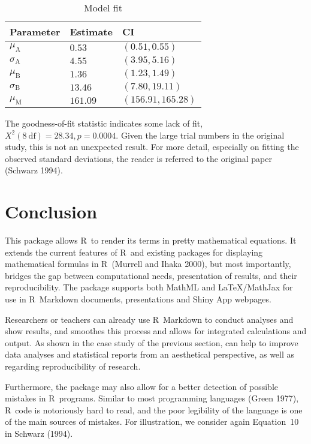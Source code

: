 \begin{table}

\caption{\label{tab:params}Model fit}
\centering
\begin{tabular}[t]{l|l|l}
\hline
Parameter & Estimate & CI\\
\hline
${\mu}_{\mathrm{A}}$ & $0.53$ & $\left({0.51}{{,}{0.55}}\right)$\\
\hline
${\sigma}_{\mathrm{A}}$ & $4.55$ & $\left({3.95}{{,}{5.16}}\right)$\\
\hline
${\mu}_{\mathrm{B}}$ & $1.36$ & $\left({1.23}{{,}{1.49}}\right)$\\
\hline
${\sigma}_{\mathrm{B}}$ & $13.46$ & $\left({7.80}{{,}{19.11}}\right)$\\
\hline
${\mu}_{\mathrm{M}}$ & $161.09$ & $\left({156.91}{{,}{165.28}}\right)$\\
\hline
\end{tabular}
\end{table}

The goodness-of-fit statistic indicates some lack of
fit, \(X^2(8\ \mathrm{df}) = 28.34,  p = 0.0004\). Given the large trial
numbers in the original study, this is not an unexpected result. For more
detail, especially on fitting the observed standard deviations, the reader is
referred to the original paper (Schwarz 1994).

\hypertarget{conclusion}{%
\section{Conclusion}\label{conclusion}}

This package allows R~to render its terms in pretty mathematical equations. It
extends the current features of R~and existing packages for displaying
mathematical formulas in R~(Murrell and Ihaka 2000), but most
importantly,  bridges the gap between computational needs,
presentation of results, and their reproducibility. The package supports both
MathML and LaTeX/MathJax for use in R~Markdown documents, presentations and
Shiny App webpages.

Researchers or teachers can already use R~Markdown to conduct analyses and show
results, and  smoothes this process and allows for integrated
calculations and output. As shown in the case study of the previous
section,  can help to improve data analyses and statistical reports
from an aesthetical perspective, as well as regarding reproducibility of
research.

Furthermore, the package may also allow for a better detection of possible
mistakes in R~programs. Similar to most programming languages (Green 1977),
R~code is notoriously hard to read, and the poor legibility of the language is
one of the main sources of mistakes. For illustration, we consider again
Equation~10 in Schwarz (1994).

